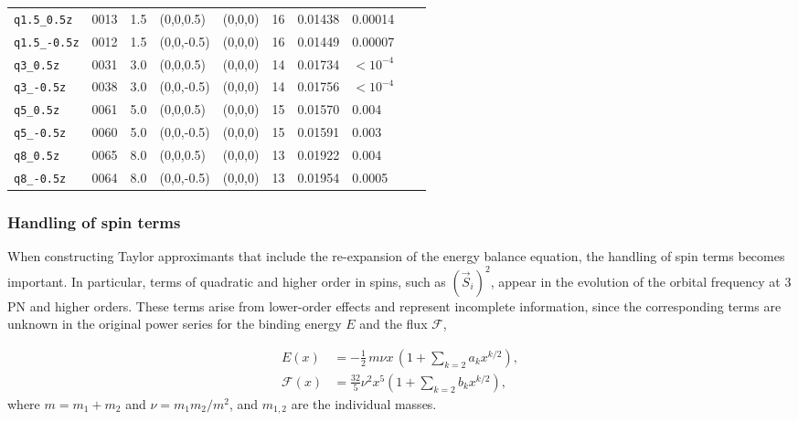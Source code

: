 \documentclass[aps,prd,amsmath,floatfix,twocolumn,superscriptaddress,nofootinbib,showpacs]{revtex4-1}
\begin{document}
\begin{table*}
\begin{ruledtabular}
\begin{tabular}{@{}llllllllll@{}}
    \verb|q1.5_0.5z| &  0013  & 1.5 & (0,0,0.5) &
    (0,0,0)  & 16 & 0.01438&  0.00014\\
    \verb|q1.5_-0.5z| & 0012  & 1.5 & (0,0,-0.5) &
    (0,0,0)  & 16 & 0.01449 &  0.00007\\
    \verb|q3_0.5z| & 0031   & 3.0 & (0,0,0.5) & (0,0,0)& 14 &
    0.01734 &  $<10^{-4}$  \\
    \verb|q3_-0.5z| & 0038  & 3.0 & (0,0,-0.5) & (0,0,0) & 14 &
    0.01756 & $<10^{-4}$  \\
    \verb|q5_0.5z| & 0061   & 5.0 & (0,0,0.5) & (0,0,0) & 15 &
    0.01570 &  0.004  \\
    \verb|q5_-0.5z| & 0060   & 5.0 & (0,0,-0.5) & (0,0,0)& 15 &
    0.01591 &  0.003  \\
    \verb|q8_0.5z|& 0065  & 8.0 & (0,0,0.5) & (0,0,0) & 13 &
    0.01922 & 0.004\\
    \verb|q8_-0.5z| & 0064   & 8.0 & (0,0,-0.5) & (0,0,0) & 13 &
    0.01954 & 0.0005 \\
  \end{tabular}
  \end{ruledtabular}
\end{table*}

\subsubsection{Handling of spin terms}
\label{sec:PNOrders}

When constructing Taylor approximants that include the re-expansion of
the energy balance equation, the handling of spin terms becomes
important. In particular, terms of quadratic and higher order in
spins, such as $(\vec{S}_{i})^{2}$, appear in the evolution of
the orbital frequency at 3 PN and higher orders. These terms arise
from lower-order effects and represent incomplete information, since the
corresponding terms are unknown in the original power series for
the binding energy $E$ and the flux $\mathcal{F}$,

\begin{align}
\label{eq:EExpansion} 
E(x) &= -\frac{1}{2}\,m\nu x\,\left(1+\sum_{k=2}a_{k}x^{k/2}\right), \\
\mathcal{F}(x) &= \frac{32}{5}\nu^{2}x^{5}\left(1+\sum_{k=2}
  b_{k}x^{k/2}\right),
\end{align}
where $m=m_1+m_2$ and $\nu = m_1 m_2/m^2$, and
$m_{1,2}$ are the individual masses.
\end{document}

